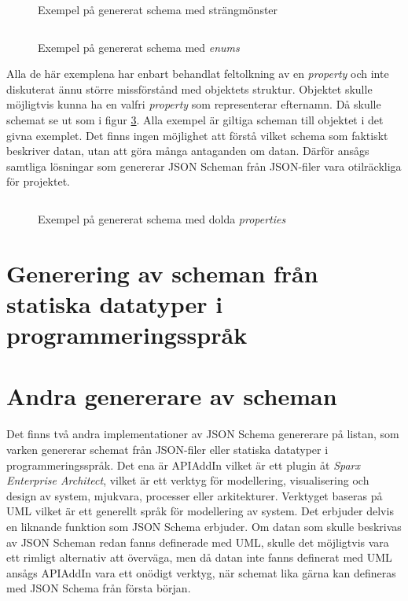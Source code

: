 \begin{figure}
	\inputminted[tabsize=2, frame=single, fontsize=\small, framesep=2mm]{json}{code/schema-generation-example/schema-example2.json}
	\vspace{-1.7em}
	\caption{Exempel på genererat schema med strängmönster}
	\label{fig:schema-super-simple-example-2}
\end{figure}


\begin{figure}
	\inputminted[tabsize=2, frame=single, fontsize=\small, framesep=2mm]{json}{code/schema-generation-example/schema-example3.json}
	\vspace{-1.7em}
	\caption{Exempel på genererat schema med \textit{enums}}
	\label{fig:schema-super-simple-example-3}
\end{figure}

Alla de här exemplena har enbart behandlat feltolkning av en \textit{property} och inte diskuterat ännu större missförstånd med objektets struktur. Objektet skulle möjligtvis kunna ha en valfri \textit{property} som representerar efternamn. Då skulle schemat se ut som i figur \ref{fig:schema-super-simple-example-4}. Alla exempel är giltiga scheman till objektet i det givna exemplet. Det finns ingen möjlighet att förstå vilket schema som faktiskt beskriver datan, utan att göra många antaganden om datan. Därför ansågs samtliga lösningar som genererar JSON Scheman från JSON-filer vara otilräckliga för projektet.

\begin{figure}
	\inputminted[tabsize=2, frame=single, fontsize=\small, framesep=2mm]{json}{code/schema-generation-example/schema-example4.json}
	\vspace{-1.7em}
	\caption{Exempel på genererat schema med dolda \textit{properties}}
	\label{fig:schema-super-simple-example-4}
\end{figure}

\section{Generering av scheman från statiska datatyper i programmeringsspråk}



\section{Andra genererare av scheman}
Det finns två andra implementationer av JSON Schema genererare på listan, som varken genererar schemat från JSON-filer eller statiska datatyper i programmeringsspråk. Det ena är APIAddIn vilket är ett plugin åt \textit{Sparx Enterprise Architect}, vilket är ett verktyg för modellering, visualisering och design av system, mjukvara, processer eller arkitekturer. Verktyget baseras på UML vilket är ett generellt språk för modellering av system. Det erbjuder delvis en liknande funktion som JSON Schema erbjuder. Om datan som skulle beskrivas av JSON Scheman redan fanns definerade med UML, skulle det möjligtvis vara ett rimligt alternativ att överväga, men då datan inte fanns definerat med UML ansågs APIAddIn vara ett onödigt verktyg, när schemat lika gärna kan defineras med JSON Schema från första början.

